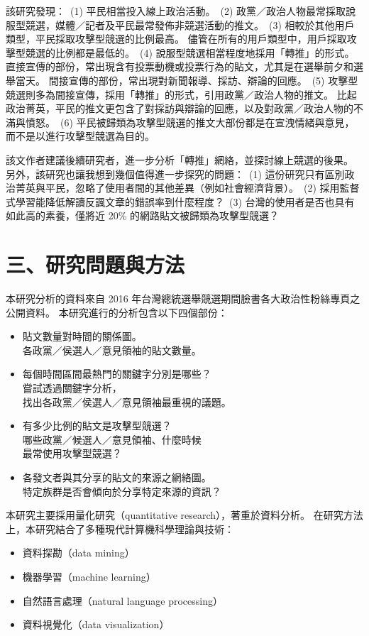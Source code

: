 \documentclass[letterpaper, 10pt, conference]{ieeeconf}   %
\begin{document}
\begin{CJK}{UTF8}{bsmi}
該研究發現：%
\,(1) 平民相當投入線上政治活動。%
\,(2) 政黨／政治人物最常採取說服型競選，媒體／記者及平民最常發佈非競選活動的推文。%
\,(3) 相較於其他用戶類型，平民採取攻擊型競選的比例最高。%
儘管在所有的用戶類型中，用戶採取攻擊型競選的比例都是最低的。%
\,(4) 說服型競選相當程度地採用「轉推」的形式。%
直接宣傳的部份，常出現含有投票動機或投票行為的貼文，尤其是在選舉前夕和選舉當天。%
間接宣傳的部份，常出現對新聞報導、採訪、辯論的回應。%
\,(5) 攻擊型競選則多為間接宣傳，採用「轉推」的形式，引用政黨／政治人物的推文。%
比起政治菁英，平民的推文更包含了對採訪與辯論的回應，以及對政黨／政治人物的不滿與憤怒。%
\,(6) 平民被歸類為攻擊型競選的推文大部份都是在宣洩情緒與意見，而不是以進行攻擊型競選為目的。%

該文作者建議後續研究者，進一步分析「轉推」網絡，並探討線上競選的後果。%
另外，該研究也讓我想到幾個值得進一步探究的問題：%
\,(1) 這份研究只有區別政治菁英與平民，忽略了使用者間的其他差異（例如社會經濟背景）。%
\,(2) 採用監督式學習能降低解讀反諷文章的錯誤率到什麼程度？%
\,(3) 台灣的使用者是否也具有如此高的素養，僅將近 20\% 的網路貼文被歸類為攻擊型競選？%

\section*{三、研究問題與方法}

本研究分析的資料來自 2016 年台灣總統選舉競選期間臉書各大政治性粉絲專頁之公開資料。%
本研究進行的分析包含以下四個部份：%
\begin{itemize}
\item 貼文數量對時間的關係圖。\\
各政黨／侯選人／意見領袖的貼文數量。%
\item 每個時間區間最熱門的關鍵字分別是哪些？\\
嘗試透過關鍵字分析，\\
找出各政黨／侯選人／意見領袖最重視的議題。%
\item 有多少比例的貼文是攻擊型競選？\\
哪些政黨／候選人／意見領袖、什麼時候\\
最常使用攻擊型競選？%
\item 各發文者與其分享的貼文的來源之網絡圖。\\
特定族群是否會傾向於分享特定來源的資訊？%
\end{itemize}

本研究主要採用量化研究（quantitative research），著重於資料分析。%
在研究方法上，本研究結合了多種現代計算機科學理論與技術：%
\begin{itemize}
\item 資料探勘（data mining）%
\item 機器學習（machine learning）%
\item 自然語言處理（natural language processing）%
\item 資料視覺化（data visualization）%
\end{itemize}


\end{CJK}
\end{document}
